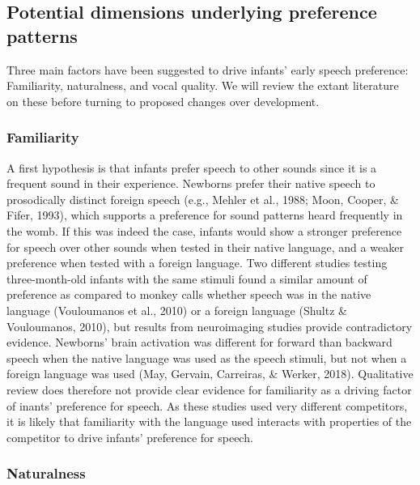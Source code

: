 \documentclass[man]{apa6}
\begin{document}
\subsection{Potential dimensions underlying preference
patterns}\label{potential-dimensions-underlying-preference-patterns}

Three main factors have been suggested to drive infants' early speech
preference: Familiarity, naturalness, and vocal quality. We will review
the extant literature on these before turning to proposed changes over
development.

\subsubsection{Familiarity}\label{familiarity}

A first hypothesis is that infants prefer speech to other sounds since
it is a frequent sound in their experience. Newborns prefer their native
speech to prosodically distinct foreign speech (e.g., Mehler et al.,
1988; Moon, Cooper, \& Fifer, 1993), which supports a preference for
sound patterns heard frequently in the womb. If this was indeed the
case, infants would show a stronger preference for speech over other
sounds when tested in their native language, and a weaker preference
when tested with a foreign language. Two different studies testing
three-month-old infants with the same stimuli found a similar amount of
preference as compared to monkey calls whether speech was in the native
language (Vouloumanos et al., 2010) or a foreign language (Shultz \&
Vouloumanos, 2010), but results from neuroimaging studies provide
contradictory evidence. Newborns' brain activation was different for
forward than backward speech when the native language was used as the
speech stimuli, but not when a foreign language was used (May, Gervain,
Carreiras, \& Werker, 2018). Qualitative review does therefore not
provide clear evidence for familiarity as a driving factor of inants'
preference for speech. As these studies used very different competitors,
it is likely that familiarity with the language used interacts with
properties of the competitor to drive infants' preference for speech.

\subsubsection{Naturalness}\label{naturalness}
\end{document}
